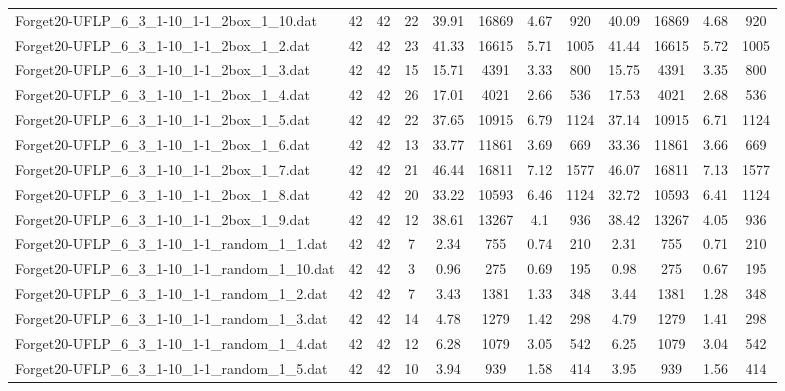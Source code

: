 \begin{sidewaystable}[!ht]
{\begin{tabular}{lccccccccccc}
Forget20-UFLP\_6\_3\_1-10\_1-1\_2box\_1\_10.dat & 42 & 42 & 22 & 39.91 & 16869 &  \textcolor{blue2}{4.67} & 920 & 40.09 & 16869 & 4.68 & 920 \\
Forget20-UFLP\_6\_3\_1-10\_1-1\_2box\_1\_2.dat & 42 & 42 & 23 & 41.33 & 16615 & 5.71 & 1005 & 41.44 & 16615 & 5.72 & 1005 \\
Forget20-UFLP\_6\_3\_1-10\_1-1\_2box\_1\_3.dat & 42 & 42 & 15 & 15.71 & 4391 &  \textcolor{blue2}{3.33} & 800 & 15.75 & 4391 & 3.35 & 800 \\
Forget20-UFLP\_6\_3\_1-10\_1-1\_2box\_1\_4.dat & 42 & 42 & 26 & 17.01 & 4021 &  \textcolor{blue2}{2.66} & 536 & 17.53 & 4021 & 2.68 & 536 \\
Forget20-UFLP\_6\_3\_1-10\_1-1\_2box\_1\_5.dat & 42 & 42 & 22 & 37.65 & 10915 & 6.79 & 1124 & 37.14 & 10915 &  \textcolor{blue2}{6.71} & 1124 \\
Forget20-UFLP\_6\_3\_1-10\_1-1\_2box\_1\_6.dat & 42 & 42 & 13 & 33.77 & 11861 & 3.69 & 669 & 33.36 & 11861 &  \textcolor{blue2}{3.66} & 669 \\
Forget20-UFLP\_6\_3\_1-10\_1-1\_2box\_1\_7.dat & 42 & 42 & 21 & 46.44 & 16811 &  \textcolor{blue2}{7.12} & 1577 & 46.07 & 16811 & 7.13 & 1577 \\
Forget20-UFLP\_6\_3\_1-10\_1-1\_2box\_1\_8.dat & 42 & 42 & 20 & 33.22 & 10593 & 6.46 & 1124 & 32.72 & 10593 &  \textcolor{blue2}{6.41} & 1124 \\
Forget20-UFLP\_6\_3\_1-10\_1-1\_2box\_1\_9.dat & 42 & 42 & 12 & 38.61 & 13267 & 4.1 & 936 & 38.42 & 13267 &  \textcolor{blue2}{4.05} & 936 \\
Forget20-UFLP\_6\_3\_1-10\_1-1\_random\_1\_1.dat & 42 & 42 & 7 & 2.34 & 755 & 0.74 & 210 & 2.31 & 755 &  \textcolor{blue2}{0.71} & 210 \\
Forget20-UFLP\_6\_3\_1-10\_1-1\_random\_1\_10.dat & 42 & 42 & 3 & 0.96 & 275 & 0.69 & 195 & 0.98 & 275 & 0.67 & 195 \\
Forget20-UFLP\_6\_3\_1-10\_1-1\_random\_1\_2.dat & 42 & 42 & 7 & 3.43 & 1381 & 1.33 & 348 & 3.44 & 1381 &  \textcolor{blue2}{1.28} & 348 \\
Forget20-UFLP\_6\_3\_1-10\_1-1\_random\_1\_3.dat & 42 & 42 & 14 & 4.78 & 1279 & 1.42 & 298 & 4.79 & 1279 &  \textcolor{blue2}{1.41} & 298 \\
Forget20-UFLP\_6\_3\_1-10\_1-1\_random\_1\_4.dat & 42 & 42 & 12 & 6.28 & 1079 & 3.05 & 542 & 6.25 & 1079 &  \textcolor{blue2}{3.04} & 542 \\
Forget20-UFLP\_6\_3\_1-10\_1-1\_random\_1\_5.dat & 42 & 42 & 10 & 3.94 & 939 & 1.58 & 414 & 3.95 & 939 &  \textcolor{blue2}{1.56} & 414 \\

\end{tabular}}
\end{sidewaystable}
